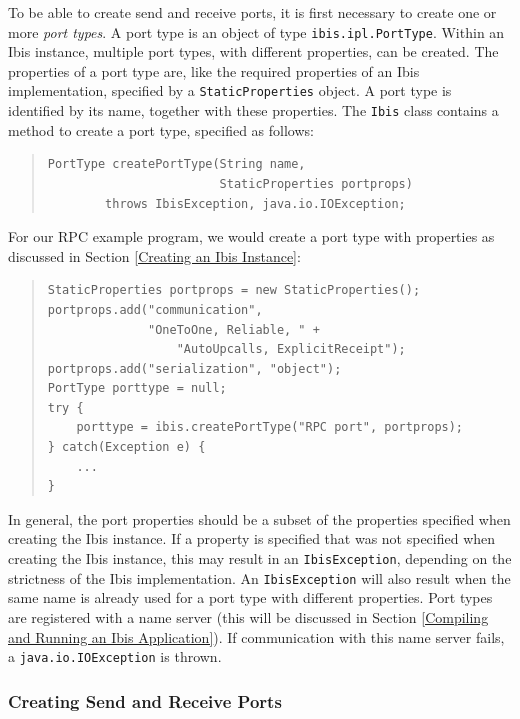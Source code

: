 \documentclass[10pt]{article}
\begin{document}
To be able to create send and receive ports, it is first necessary
to create one or more \emph{port types}.
A port type is an object
of type \texttt{ibis.ipl.PortType}.
Within an Ibis instance,
multiple port types, with different properties, can be created.
The properties of a port type are, like the required properties
of an Ibis implementation, specified by a \texttt{StaticProperties} object.
A port type is identified by its name, together with these properties.
The \texttt{Ibis} class contains a method to create a port type,
specified as follows:
\begin{quote}
\begin{verbatim}
PortType createPortType(String name,
                        StaticProperties portprops)
        throws IbisException, java.io.IOException;
\end{verbatim}
\end{quote}

\noindent
For our RPC example program, we would create a port type with properties
as discussed in Section \ref{Creating an Ibis Instance}:

\begin{quote}
\begin{verbatim}
StaticProperties portprops = new StaticProperties();
portprops.add("communication",
              "OneToOne, Reliable, " + 
                  "AutoUpcalls, ExplicitReceipt");
portprops.add("serialization", "object");
PortType porttype = null;
try {
    porttype = ibis.createPortType("RPC port", portprops);
} catch(Exception e) {
    ...
}
\end{verbatim}
\end{quote}
\noindent
In general, the port properties should be a subset of the properties
specified when creating the Ibis instance. If a property is specified
that was not specified when creating the Ibis instance, this may
result in an \texttt{IbisException}, depending on the strictness of the
Ibis implementation.
An \texttt{IbisException} will also result when the same name is
already used for a port type with different properties.
Port types are registered with a name server
(this will be discussed in Section \ref{Compiling and Running an Ibis Application}).
If communication with this name server fails, a
\texttt{java.io.IOException} is thrown.

\subsubsection{Creating Send and Receive Ports}
\end{document}
